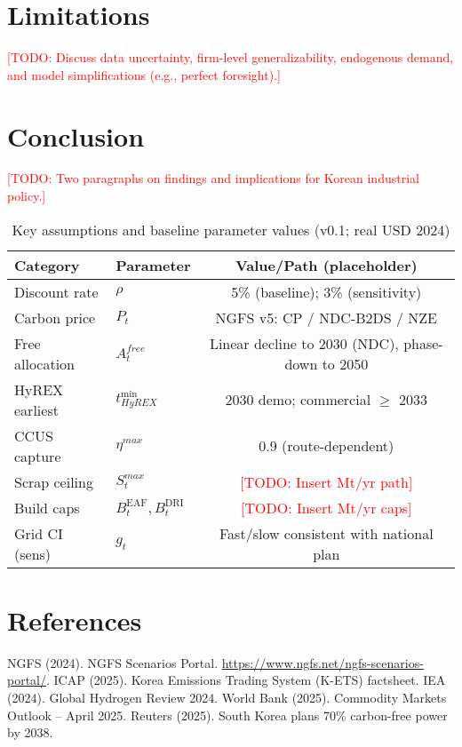 \documentclass[preprint,5p,authoryear]{elsarticle}
\newcommand{\todo}[1]{\textcolor{red}{[TODO: #1]}}
\begin{document}
\section{Limitations}
\todo{Discuss data uncertainty, firm-level generalizability, endogenous demand, and model simplifications (e.g., perfect foresight).}

\section{Conclusion}
\todo{Two paragraphs on findings and implications for Korean industrial policy.}

\begin{table}[ht]
  \centering
  \caption{Key assumptions and baseline parameter values (v0.1; real USD 2024)}
  \label{tab:assumptions}
  \begin{threeparttable}
  \begin{tabular}{@{}llc@{}}
    \toprule
    Category & Parameter & Value/Path (placeholder) \\
    \midrule
    Discount rate & $\rho$ & 5\% (baseline); 3\% (sensitivity) \\
    Carbon price & $P_t$ & NGFS v5: CP / NDC-B2DS / NZE \\
    Free allocation & $A^{free}_t$ & Linear decline to 2030 (NDC), phase-down to 2050 \\
    HyREX earliest & $t^{\min}_{HyREX}$ & 2030 demo; commercial $\ge$ 2033 \\
    CCUS capture & $\eta^{max}$ & 0.9 (route-dependent) \\
    Scrap ceiling & $S^{max}_t$ & \todo{Insert Mt/yr path} \\
    Build caps & $B^{\mathrm{EAF}}_t, B^{\mathrm{DRI}}_t$ & \todo{Insert Mt/yr caps} \\
    Grid CI (sens) & $g_t$ & Fast/slow consistent with national plan \\
    \bottomrule
  \end{tabular}
  \end{threeparttable}
\end{table}

\section*{References}
\begin{thebibliography}{99}
 NGFS (2024). NGFS Scenarios Portal. \url{https://www.ngfs.net/ngfs-scenarios-portal/}.
 ICAP (2025). Korea Emissions Trading System (K-ETS) factsheet.
 IEA (2024). Global Hydrogen Review 2024.
 World Bank (2025). Commodity Markets Outlook – April 2025.
 Reuters (2025). South Korea plans 70\% carbon-free power by 2038.
\end{thebibliography}
\end{document}
